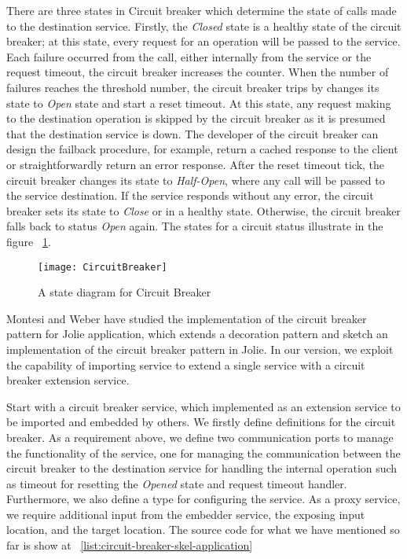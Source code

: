 There are three states in Circuit breaker which determine the state of calls made to the destination service. Firstly, the \textit{Closed} state is a healthy state of the circuit breaker; at this state, every request for an operation will be passed to the service. Each failure occurred from the call, either internally from the service or the request timeout, the circuit breaker increases the counter. When the number of failures reaches the threshold number, the circuit breaker trips by changes its state to \textit{Open} state and start a reset timeout. At this state, any request making to the destination operation is skipped by the circuit breaker as it is presumed that the destination service is down. The developer of the circuit breaker can design the failback procedure, for example, return a cached response to the client or straightforwardly return an error response. After the reset timeout tick, the circuit breaker changes its state to \textit{Half-Open}, where any call will be passed to the service destination. If the service responds without any error, the circuit breaker sets its state to \textit{Close} or in a healthy state. Otherwise, the circuit breaker falls back to status \textit{Open} again. The states for a circuit status illustrate in the figure ~\ref{list:circuit-breaker}.

\begin{figure}[ht]
    \texttt{[image: CircuitBreaker]}
    \centering
    \caption{A state diagram for Circuit Breaker}
    \label{list:circuit-breaker}
\end{figure}

Montesi and Weber have studied the implementation of the circuit breaker pattern for Jolie application\cite{10.1145/3167132.3167427}, which extends a decoration pattern and sketch an implementation of the circuit breaker pattern in Jolie. In our version, we exploit the capability of importing service to extend a single service with a circuit breaker extension service.

Start with a circuit breaker service, which implemented as an extension service to be imported and embedded by others. We firstly define definitions for the circuit breaker. As a requirement above, we define two communication ports to manage the functionality of the service, one for managing the communication between the circuit breaker to the destination service for handling the internal operation such as timeout for resetting the \textit{Opened} state and request timeout handler. Furthermore, we also define a type for configuring the service. As a proxy service, we require additional input from the embedder service, the exposing input location, and the target location. The source code for what we have mentioned so far is show at ~\ref{list:circuit-breaker-skel-application}

